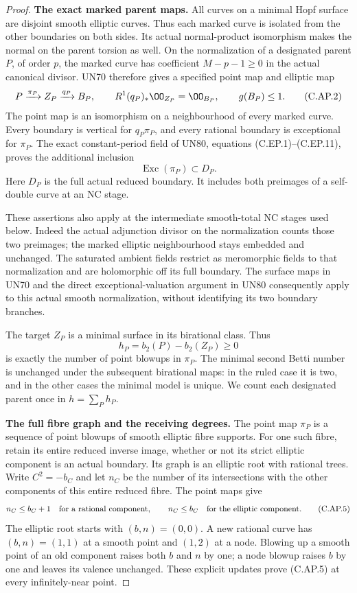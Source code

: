 \begin{proof}
\par\medskip\noindent\textbf{The exact marked parent maps.}
All curves on a minimal Hopf surface are disjoint smooth
elliptic curves. Thus each marked curve is isolated from
the other boundaries on both sides. Its actual normal-product
isomorphism makes the normal on the parent torsion as well.
On the normalization of a designated parent \(P\), of order
\(p\), the marked curve has coefficient
\(M-p-1\ge0\) in the actual canonical divisor. UN70 therefore
gives a specified point map and elliptic map
\[
 P\xrightarrow{\pi_P} Z_P\xrightarrow{q_P}B_P,
 \qquad R^1(q_P)_*\OO_{Z_P}=\OO_{B_P},
 \qquad g(B_P)\le1.
 \tag{C.AP.2}
\]
The point map is an isomorphism on a neighbourhood of every
marked curve. Every boundary is vertical for \(q_P\pi_P\),
and every rational boundary is exceptional for \(\pi_P\).
The exact constant-period field of UN80, equations
(C.EP.1)--(C.EP.11), proves the additional inclusion
\[
                 \operatorname{Exc}(\pi_P)\subset D_P.
 \tag{C.AP.3}
\]
Here \(D_P\) is the full actual reduced boundary. It includes
both preimages of a self-double curve at an NC stage.

These assertions also apply at the intermediate smooth-total
NC stages used below. Indeed the actual adjunction divisor
on the normalization counts those two preimages; the marked
elliptic neighbourhood stays embedded and unchanged. The
saturated ambient fields restrict as meromorphic fields to
that normalization and are holomorphic off its full boundary.
The surface maps in UN70 and the direct exceptional-valuation
argument in UN80 consequently apply to this actual smooth
normalization, without identifying its two boundary branches.

The target \(Z_P\) is a minimal surface in its birational
class. Thus
\[
 h_P=b_2(P)-b_2(Z_P)\ge0
 \tag{C.AP.4}
\]
is exactly the number of point blowups in \(\pi_P\). The
minimal second Betti number is unchanged under the subsequent
birational maps: in the ruled case it is two, and in the
other cases the minimal model is unique. We count each
designated parent once in \(h=\sum_P h_P\).

\par\medskip\noindent\textbf{The full fibre graph and the receiving degrees.}
The point map \(\pi_P\) is a sequence of point blowups of
smooth elliptic fibre supports. For one such fibre, retain
its entire reduced inverse image, whether or not its strict
elliptic component is an actual boundary. Its graph is an
elliptic root with rational trees. Write \(C^2=-b_C\) and let
\(n_C\) be the number of its intersections with the other
components of this entire reduced fibre. The point maps give
\[
 n_C\le b_C+1\quad\hbox{for a rational component},\qquad
 n_C\le b_C\quad\hbox{for the elliptic component}.
 \tag{C.AP.5}
\]
The elliptic root starts with \((b,n)=(0,0)\). A new rational
curve has \((b,n)=(1,1)\) at a smooth point and \((1,2)\) at
a node. Blowing up a smooth point of an old component raises
both \(b\) and \(n\) by one; a node blowup raises \(b\) by one
and leaves its valence unchanged. These explicit updates
prove (C.AP.5) at every infinitely-near point.


\end{proof}
